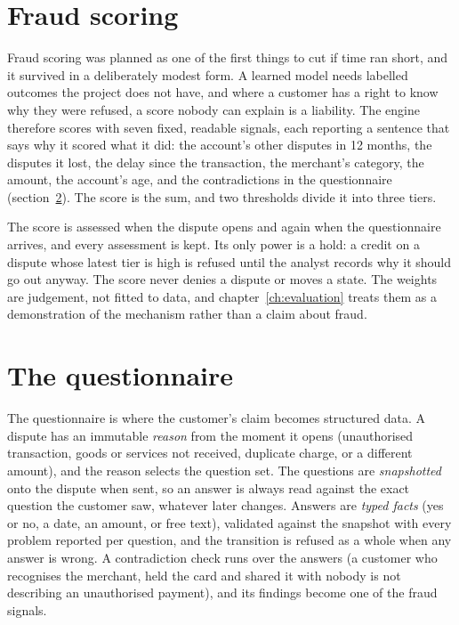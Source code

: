 \section{Fraud scoring}
\label{sec:design-fraud}

Fraud scoring was planned as one of the first things to cut if time ran short, and it survived in a deliberately modest
form. A learned model needs labelled outcomes the project does not have, and where a customer has a right to know
why they were refused, a score nobody can explain is a liability. The engine therefore scores with seven fixed,
readable signals, each reporting a sentence that says why it scored what it did: the account's other disputes in
12 months, the disputes it lost, the delay since the transaction, the merchant's category, the amount, the
account's age, and the contradictions in the questionnaire (section~\ref{sec:design-questionnaire}). The score is
the sum, and two thresholds divide it into three tiers.

The score is assessed when the dispute opens and again when the questionnaire arrives, and every assessment is
kept. Its only power is a hold: a credit on a dispute whose latest tier is high is refused until the analyst
records why it should go out anyway. The score never denies a dispute or moves a state. The weights are judgement, not fitted to data, and chapter~\ref{ch:evaluation} treats them as a
demonstration of the mechanism rather than a claim about fraud.

\section{The questionnaire}
\label{sec:design-questionnaire}

The questionnaire is where the customer's claim becomes structured data. A dispute has an immutable
\emph{reason} from the moment it opens (unauthorised transaction, goods or services not received, duplicate
charge, or a different amount), and the reason selects the question set. The questions are \emph{snapshotted}
onto the dispute when sent, so an answer is always read against the exact question the customer saw, whatever
later changes. Answers are \emph{typed facts} (yes or no, a date, an amount, or free text), validated against the
snapshot with every problem reported per question, and the transition is refused as a whole when any answer is
wrong. A contradiction check runs over the answers (a customer who recognises the merchant, held the card and shared it
with nobody is not describing an unauthorised payment), and its findings become one of the fraud signals.

